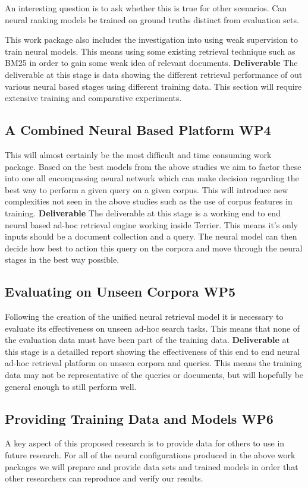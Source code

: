 \documentclass[11pt,english,twocolumn]{article}
\begin{document}
An interesting question is to ask whether this is true for other scenarios. Can neural ranking models be trained on ground truths distinct from evaluation sets.

This work package also includes the investigation into using weak supervision to train neural models. This means using some existing retrieval technique such as BM25 in order to gain some weak idea of relevant documents.
\textbf{Deliverable}
The deliverable at this stage is data showing the different retrieval performance of out various neural based stages using different training data. This section will require extensive training and comparative experiments.

\subsection{A Combined Neural Based Platform \textbf{WP4}}
This will almost certainly be the most difficult and time consuming work package. Based on the best models from the above studies we aim to factor these into one all encompassing neural network which can make decision regarding the best way to perform a given query on a given corpus.
This will introduce new complexities not seen in the above studies such as the use of corpus features in training.
\textbf{Deliverable} The deliverable at this stage is a working end to end neural based ad-hoc retrieval engine working inside Terrier. This means it's only inputs should be a document collection and a query. The neural model can then decide how best to action this query on the corpora and move through the neural stages in the best way possible.

\subsection{Evaluating on Unseen Corpora \textbf{WP5}}
Following the creation of the unified neural retrieval model it is necessary to evaluate its effectiveness on unseen ad-hoc search tasks. This means that none of the evaluation data must have been part of the training data. \textbf{Deliverable} at this stage is a detailled report showing the effectiveness of this end to end neural ad-hoc retrieval platform on unseen corpora and queries. This means the training data may not be representative of the queries or documents, but will hopefully be general enough to still perform well.

\subsection{Providing Training Data and Models \textbf{WP6}}
A key aspect of this proposed research is to provide data for others to use in future research. For all of the neural configurations produced in the above work packages we will prepare and provide data sets and trained models in order that other researchers can reproduce and verify our results.
\end{document}
